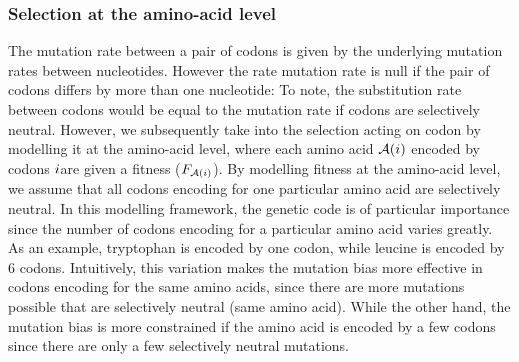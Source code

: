 \subsubsection{Selection at the amino-acid level}
\label{sec-mut-bias:aa-selection}
The mutation rate between a pair of codons is given by the underlying mutation rates between nucleotides.
However the rate mutation rate is null if the pair of codons differs by more than one nucleotide:
To note, the substitution rate between codons would be equal to the mutation rate if codons are selectively neutral.
However, we subsequently take into the selection acting on codon by modelling it at the amino-acid level, where each amino acid $\mathcal{A}({i})$ encoded by codons ${i} $are given a fitness ($F_{\mathcal{A}({i})}$).
By modelling fitness at the amino-acid level, we assume that all codons encoding for one particular amino acid are selectively neutral.
In this modelling framework, the genetic code is of particular importance since the number of codons encoding for a particular amino acid varies greatly.
As an example, tryptophan is encoded by one codon, while leucine is encoded by 6 codons.
Intuitively, this variation makes the mutation bias more effective in codons encoding for the same amino acids, since there are more mutations possible that are selectively neutral (same amino acid).
While the other hand, the mutation bias is more constrained if the amino acid is encoded by a few codons since there are only a few selectively neutral mutations.\\

